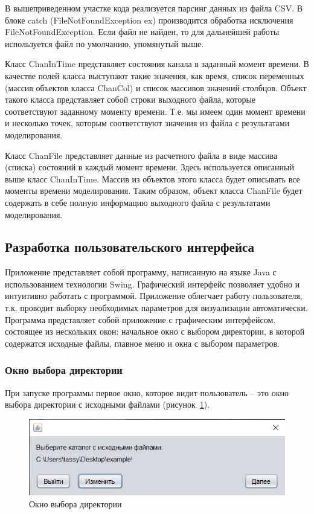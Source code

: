 В вышеприведенном участке кода реализуется парсинг данных из файла CSV. В блоке catch (FileNotFoundException ex) производится обработка исключения FileNotFoundException. Если файл не найден, то для дальнейшей работы используется файл по умолчанию, упомянутый выше. 

Класс ChanInTime представляет состояния канала в заданный момент времени. В качестве полей класса выступают такие значения, как время, список переменных (массив объектов класса ChanCol) и список массивов значений столбцов. Объект такого класса представляет собой строки выходного файла, которые соответствуют заданному моменту времени. Т.е. мы имеем один момент времени и несколько точек, которым соответствуют значения из файла с результатами моделирования.

Класс ChanFile представляет данные из расчетного файла в виде массива (списка) состояний в каждый момент времени. Здесь используется описанный выше класс ChanInTime. Массив из объектов этого класса будет описывать все моменты времени моделирования. Таким образом, объект класса ChanFile будет содержать в себе полную информацию выходного файла с результатами моделирования.

\subsection{Разработка пользовательского интерфейса}

Приложение представляет собой программу, написанную на языке Java с использованием технологии Swing. Графический интерфейс позволяет удобно и интуитивно работать с программой. Приложение облегчает работу пользователя, т.к. проводит выборку необходимых параметров для визуализации автоматически. 
Программа представляет собой приложение с графическим интерфейсом, состоящее из нескольких окон: начальное окно с выбором директории, в которой содержатся исходные файлы, главное меню и окна с выбором параметров. 

\subsubsection{Окно выбора директории}

При запуске программы первое окно, которое видит пользователь – это окно выбора директории с исходными файлами (рисунок~\ref{fig:dir}). 
\begin{figure}[H]
	\centering
	\includegraphics[width=0.7\linewidth]{pics/dir}
	\caption{Окно выбора директории}
	\label{fig:dir}
\end{figure}

